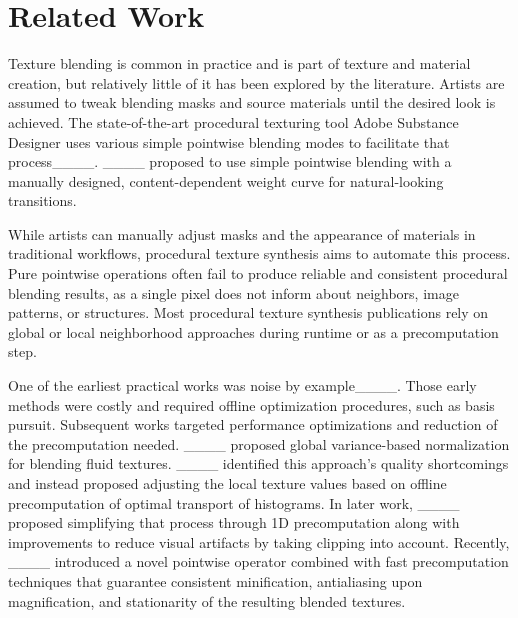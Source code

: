 \section{Related Work}

Texture blending is common in practice and is part of texture and material creation, but relatively little of it has been explored by the literature.
Artists are assumed to tweak blending masks and source materials until the desired look is achieved.
The state-of-the-art procedural texturing tool Adobe Substance Designer uses various simple pointwise blending modes to facilitate that process____.
____ proposed to use simple pointwise blending with a manually designed, content-dependent weight curve for natural-looking transitions.

While artists can manually adjust masks and the appearance of materials in traditional workflows, procedural texture synthesis aims to automate this process.
Pure pointwise operations often fail to produce reliable and consistent procedural blending results, as a single pixel does not inform about neighbors, image patterns, or structures.
Most procedural texture synthesis publications rely on global or local neighborhood approaches during runtime or as a precomputation step.

One of the earliest practical works was noise by example____.
Those early methods were costly and required offline optimization procedures, such as basis pursuit.
Subsequent works targeted performance optimizations and reduction of the precomputation needed.
____ proposed global variance-based normalization for blending fluid textures. 
____ identified this approach's quality shortcomings and instead proposed adjusting the local texture values based on offline precomputation of optimal transport of histograms.
In later work, ____ proposed simplifying that process through 1D precomputation along with improvements to reduce visual artifacts by taking clipping into account.
Recently, ____ introduced a novel pointwise operator combined with fast precomputation techniques that guarantee consistent minification, antialiasing upon magnification, and stationarity of the resulting blended textures.

\enlargethispage{3pt}